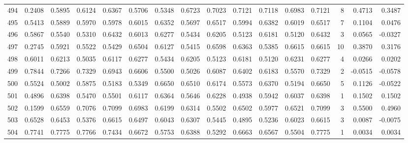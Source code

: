 \begin{tabular}{lrrrrrrrrrrrrrrr}
494 &      0.2408 &  0.5895 &  0.6124 &  0.6367 &  0.5706 &  0.5348 &  0.6723 &  0.7023 &  0.7121 &  0.7118 &   0.6983 &     0.7121 &      8 &                    0.4713 &                     0.3487 \\
495 &      0.5413 &  0.5889 &  0.5970 &  0.5978 &  0.6015 &  0.6352 &  0.5697 &  0.6517 &  0.5994 &  0.6382 &   0.6019 &     0.6517 &      7 &                    0.1104 &                     0.0476 \\
496 &      0.5867 &  0.5540 &  0.5310 &  0.6432 &  0.6013 &  0.6277 &  0.5434 &  0.6205 &  0.5123 &  0.6181 &   0.5120 &     0.6432 &      3 &                    0.0565 &                    -0.0327 \\
497 &      0.2745 &  0.5921 &  0.5522 &  0.5429 &  0.6504 &  0.6127 &  0.5415 &  0.6598 &  0.6363 &  0.5385 &   0.6615 &     0.6615 &     10 &                    0.3870 &                     0.3176 \\
498 &      0.6011 &  0.6213 &  0.5035 &  0.6117 &  0.6277 &  0.5434 &  0.6205 &  0.5123 &  0.6181 &  0.5120 &   0.6231 &     0.6277 &      4 &                    0.0266 &                     0.0202 \\
499 &      0.7844 &  0.7266 &  0.7329 &  0.6943 &  0.6606 &  0.5500 &  0.5026 &  0.6087 &  0.6402 &  0.6183 &   0.5570 &     0.7329 &      2 &                   -0.0515 &                    -0.0578 \\
500 &      0.5524 &  0.5002 &  0.5875 &  0.5183 &  0.5349 &  0.6650 &  0.6510 &  0.6174 &  0.5573 &  0.6370 &   0.5194 &     0.6650 &      5 &                    0.1126 &                    -0.0522 \\
501 &      0.4896 &  0.6398 &  0.5470 &  0.5501 &  0.6117 &  0.6364 &  0.5646 &  0.6228 &  0.4938 &  0.5942 &   0.6037 &     0.6398 &      1 &                    0.1502 &                     0.1502 \\
502 &      0.1599 &  0.6559 &  0.7076 &  0.7099 &  0.6983 &  0.6199 &  0.6314 &  0.5502 &  0.6502 &  0.5977 &   0.6521 &     0.7099 &      3 &                    0.5500 &                     0.4960 \\
503 &      0.6528 &  0.6453 &  0.5376 &  0.6615 &  0.6497 &  0.6043 &  0.6307 &  0.5445 &  0.4895 &  0.5236 &   0.6023 &     0.6615 &      3 &                    0.0087 &                    -0.0075 \\
504 &      0.7741 &  0.7775 &  0.7766 &  0.7434 &  0.6672 &  0.5753 &  0.6388 &  0.5292 &  0.6663 &  0.6567 &   0.5504 &     0.7775 &      1 &                    0.0034 &                     0.0034 \\

\end{tabular}
